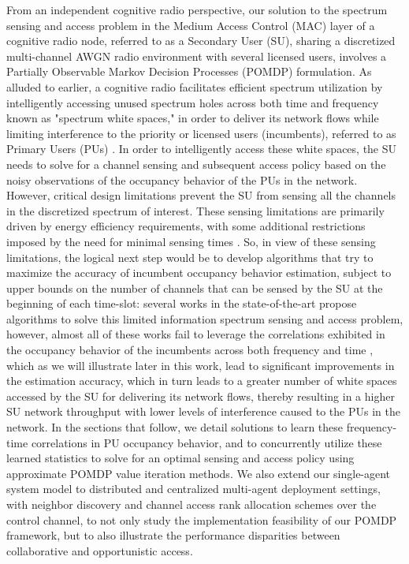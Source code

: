 \documentclass[12pt, draftcls, onecolumn]{IEEEtran}
\begin{document}
From an independent cognitive radio perspective, our solution to the spectrum sensing and access problem in the Medium Access Control (MAC) layer of a cognitive radio node, referred to as a Secondary User (SU), sharing a discretized multi-channel AWGN radio environment with several licensed users, involves a Partially Observable Markov Decision Processes (POMDP) formulation. As alluded to earlier, a cognitive radio facilitates efficient spectrum utilization by intelligently accessing unused spectrum holes across both time and frequency known as "spectrum white spaces," in order to deliver its network flows while limiting interference to the priority or licensed users (incumbents), referred to as Primary Users (PUs) \cite{WCL:2}. In order to intelligently access these white spaces, the SU needs to solve for a channel sensing and subsequent access policy based on the noisy observations of the occupancy behavior of the PUs in the network. However, critical design limitations prevent the SU from sensing all the channels in the discretized spectrum of interest. These sensing limitations are primarily driven by energy efficiency requirements, with some additional restrictions imposed by the need for minimal sensing times \cite{WCL:3}. So, in view of these sensing limitations, the logical next step would be to develop algorithms that try to maximize the accuracy of incumbent occupancy behavior estimation, subject to upper bounds on the number of channels that can be sensed by the SU at the beginning of each time-slot: several works in the state-of-the-art \cite{WCL:4, WCL:5, WCL:6, WCL:7} propose algorithms to solve this limited information spectrum sensing and access problem, however, almost all of these works \cite{WCL:4, WCL:5, WCL:8, WCL:9, WCL:10, WCL:11} fail to leverage the correlations exhibited in the occupancy behavior of the incumbents across both frequency and time \cite{WCL:12}, which as we will illustrate later in this work, lead to significant improvements in the estimation accuracy, which in turn leads to a greater number of white spaces accessed by the SU for delivering its network flows, thereby resulting in a higher SU network throughput with lower levels of interference caused to the PUs in the network. In the sections that follow, we detail solutions to learn these frequency-time correlations in PU occupancy behavior, and to concurrently utilize these learned statistics to solve for an optimal sensing and access policy using approximate POMDP value iteration methods. We also extend our single-agent system model to distributed and centralized multi-agent deployment settings, with neighbor discovery and channel access rank allocation schemes over the control channel, to not only study the implementation feasibility of our POMDP framework, but to also illustrate the performance disparities between collaborative and opportunistic access.
\end{document}
